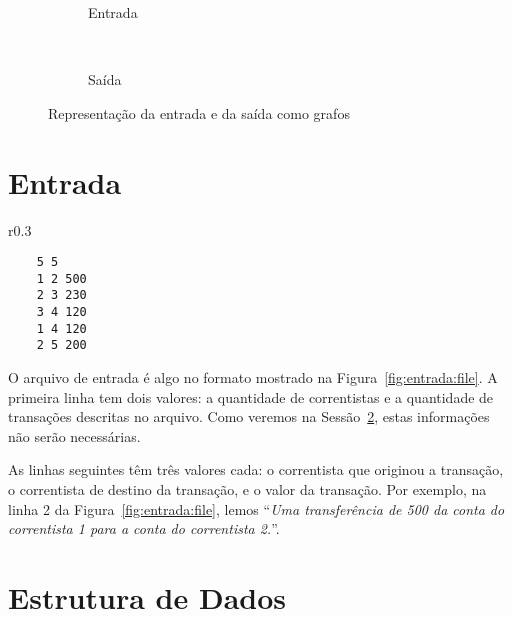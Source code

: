 \documentclass[12pt]{article}
\begin{document}
\begin{figure}[htb!]
  \centering
  \begin{subfigure}[b]{0.5\textwidth}
    \begin{dot2tex}[neato,options=-tmath]
        
    \end{dot2tex}
    \caption{Entrada}
    \label{fig:intro:entrada}
  \end{subfigure}%
  ~
  \begin{subfigure}[b]{0.5\textwidth}
    \begin{dot2tex}[neato,options=-tmath]
        
    \end{dot2tex}
    \caption{Saída}
    \label{fig:intro:saída}
  \end{subfigure}
  \caption{Representação da entrada e da saída como grafos}
\end{figure}

\section{Entrada}\label{sec:entrada}

\begin{wrapfigure}{r}{0.3\textwidth}
  \vspace{-20pt}
  \begin{center}
    \begin{lstlisting}
    5 5
    1 2 500
    2 3 230
    3 4 120
    1 4 120
    2 5 200
    \end{lstlisting}
  \end{center}
  \caption{Arquivo de entrada}
  \vspace{-10pt}
\label{fig:entrada:file}
\end{wrapfigure}

O arquivo de entrada é algo no formato mostrado na Figura~\ref{fig:entrada:file}.
A primeira linha tem dois valores: a quantidade de correntistas e a quantidade
de transações descritas no arquivo. Como veremos na Sessão~\ref{sec:estrutura},
estas informações não serão necessárias.

As linhas seguintes têm três valores cada: o correntista que originou a
transação, o correntista de destino da transação, e o valor da transação. Por
exemplo, na linha 2 da Figura~\ref{fig:entrada:file}, lemos ``\textit{Uma
  transferência de 500 da conta do correntista 1 para a conta do correntista 2.}''.

\section{Estrutura de Dados}\label{sec:estrutura}
\end{document}
